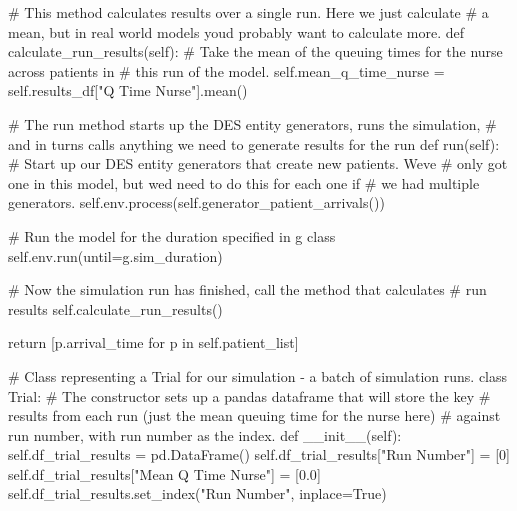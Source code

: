 \documentclass[
  letterpaper,
  DIV=11,
  numbers=noendperiod]{scrreprt}
\newenvironment{Shaded}{\begin{snugshade}}{\end{snugshade}}
\newcommand{\CommentTok}[1]{\textcolor[rgb]{0.37,0.37,0.37}{#1}}
\newcommand{\ControlFlowTok}[1]{\textcolor[rgb]{0.00,0.23,0.31}{#1}}
\newcommand{\DecValTok}[1]{\textcolor[rgb]{0.68,0.00,0.00}{#1}}
\newcommand{\FloatTok}[1]{\textcolor[rgb]{0.68,0.00,0.00}{#1}}
\newcommand{\FunctionTok}[1]{\textcolor[rgb]{0.28,0.35,0.67}{#1}}
\newcommand{\KeywordTok}[1]{\textcolor[rgb]{0.00,0.23,0.31}{#1}}
\newcommand{\NormalTok}[1]{\textcolor[rgb]{0.00,0.23,0.31}{#1}}
\newcommand{\OperatorTok}[1]{\textcolor[rgb]{0.37,0.37,0.37}{#1}}
\newcommand{\StringTok}[1]{\textcolor[rgb]{0.13,0.47,0.30}{#1}}
\newcommand{\VariableTok}[1]{\textcolor[rgb]{0.07,0.07,0.07}{#1}}
\begin{document}
\begin{tcolorbox}
\begin{Shaded}
\begin{Highlighting}[]
    \CommentTok{\# This method calculates results over a single run.  Here we just calculate}
    \CommentTok{\# a mean, but in real world models you\textquotesingle{}d probably want to calculate more.}
    \KeywordTok{def}\NormalTok{ calculate\_run\_results(}\VariableTok{self}\NormalTok{):}
        \CommentTok{\# Take the mean of the queuing times for the nurse across patients in}
        \CommentTok{\# this run of the model.}
        \VariableTok{self}\NormalTok{.mean\_q\_time\_nurse }\OperatorTok{=} \VariableTok{self}\NormalTok{.results\_df[}\StringTok{"Q Time Nurse"}\NormalTok{].mean()}

    \CommentTok{\# The run method starts up the DES entity generators, runs the simulation,}
    \CommentTok{\# and in turns calls anything we need to generate results for the run}
    \KeywordTok{def}\NormalTok{ run(}\VariableTok{self}\NormalTok{):}
        \CommentTok{\# Start up our DES entity generators that create new patients.  We\textquotesingle{}ve}
        \CommentTok{\# only got one in this model, but we\textquotesingle{}d need to do this for each one if}
        \CommentTok{\# we had multiple generators.}
        \VariableTok{self}\NormalTok{.env.process(}\VariableTok{self}\NormalTok{.generator\_patient\_arrivals())}

        \CommentTok{\# Run the model for the duration specified in g class}
        \VariableTok{self}\NormalTok{.env.run(until}\OperatorTok{=}\NormalTok{g.sim\_duration)}

        \CommentTok{\# Now the simulation run has finished, call the method that calculates}
        \CommentTok{\# run results}
        \VariableTok{self}\NormalTok{.calculate\_run\_results()}

        \ControlFlowTok{return}\NormalTok{ [p.arrival\_time }\ControlFlowTok{for}\NormalTok{ p }\KeywordTok{in} \VariableTok{self}\NormalTok{.patient\_list]}

\CommentTok{\# Class representing a Trial for our simulation {-} a batch of simulation runs.}
\KeywordTok{class}\NormalTok{ Trial:}
    \CommentTok{\# The constructor sets up a pandas dataframe that will store the key}
    \CommentTok{\# results from each run (just the mean queuing time for the nurse here)}
    \CommentTok{\# against run number, with run number as the index.}
    \KeywordTok{def}  \FunctionTok{\_\_init\_\_}\NormalTok{(}\VariableTok{self}\NormalTok{):}
        \VariableTok{self}\NormalTok{.df\_trial\_results }\OperatorTok{=}\NormalTok{ pd.DataFrame()}
        \VariableTok{self}\NormalTok{.df\_trial\_results[}\StringTok{"Run Number"}\NormalTok{] }\OperatorTok{=}\NormalTok{ [}\DecValTok{0}\NormalTok{]}
        \VariableTok{self}\NormalTok{.df\_trial\_results[}\StringTok{"Mean Q Time Nurse"}\NormalTok{] }\OperatorTok{=}\NormalTok{ [}\FloatTok{0.0}\NormalTok{]}
        \VariableTok{self}\NormalTok{.df\_trial\_results.set\_index(}\StringTok{"Run Number"}\NormalTok{, inplace}\OperatorTok{=}\VariableTok{True}\NormalTok{)}


\end{Highlighting}
\end{Shaded}
\end{tcolorbox}
\end{document}
